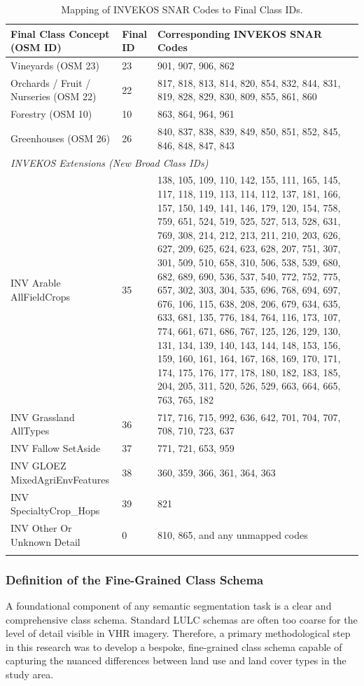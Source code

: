\documentclass{report}
\begin{document}
\begin{longtable}{@{}p{} p{} p{}@{}}
\caption{Mapping of INVEKOS SNAR Codes to Final Class IDs.}\\
\toprule
\textbf{Final Class Concept (OSM ID)} & \textbf{Final ID} & \textbf{Corresponding INVEKOS SNAR Codes} \\
\midrule
\endhead

Vineyards (OSM 23) & 23 & 901, 907, 906, 862 \\
\hline
Orchards / Fruit / Nurseries (OSM 22) & 22 & 817, 818, 813, 814, 820, 854, 832, 844, 831, 819, 828, 829, 830, 809, 855, 861, 860 \\
\hline
Forestry (OSM 10) & 10 & 863, 864, 964, 961 \\
\hline
Greenhouses (OSM 26) & 26 & 840, 837, 838, 839, 849, 850, 851, 852, 845, 846, 848, 847, 843 \\
\midrule
\multicolumn{3}{l}{\textit{INVEKOS Extensions (New Broad Class IDs)}} \\
\midrule
INV Arable AllFieldCrops & 35 & 138, 105, 109, 110, 142, 155, 111, 165, 145, 117, 118, 119, 113, 114, 112, 137, 181, 166, 157, 150, 149, 141, 146, 179, 120, 154, 758, 759, 651, 524, 519, 525, 527, 513, 528, 631, 769, 308, 214, 212, 213, 211, 210, 203, 626, 627, 209, 625, 624, 623, 628, 207, 751, 307, 301, 509, 510, 658, 310, 506, 538, 539, 680, 682, 689, 690, 536, 537, 540, 772, 752, 775, 657, 302, 303, 304, 535, 696, 768, 694, 697, 676, 106, 115, 638, 208, 206, 679, 634, 635, 633, 681, 135, 776, 184, 764, 116, 173, 107, 774, 661, 671, 686, 767, 125, 126, 129, 130, 131, 134, 139, 140, 143, 144, 148, 153, 156, 159, 160, 161, 164, 167, 168, 169, 170, 171, 174, 175, 176, 177, 178, 180, 182, 183, 185, 204, 205, 311, 520, 526, 529, 663, 664, 665, 763, 765, 182 \\
\hline
INV Grassland AllTypes & 36 & 717, 716, 715, 992, 636, 642, 701, 704, 707, 708, 710, 723, 637 \\
\hline
INV Fallow SetAside & 37 & 771, 721, 653, 959 \\
\hline
INV GLOEZ MixedAgriEnvFeatures & 38 & 360, 359, 366, 361, 364, 363 \\
\hline
INV SpecialtyCrop\_Hops & 39 & 821 \\
\hline
INV Other Or Unknown Detail & 0 & 810, 865, and any unmapped codes \\
\label{tab:invekos_mapping} 
\end{longtable}


\subsubsection{Definition of the Fine-Grained Class Schema}
\label{sec:def_class_schema}
A foundational component of any semantic segmentation task is a clear and comprehensive class schema. Standard LULC schemas are often too coarse for the level of detail visible in VHR imagery. Therefore, a primary methodological step in this research was to develop a bespoke, fine-grained class schema capable of capturing the nuanced differences between land use and land cover types in the study area.
\end{document}

